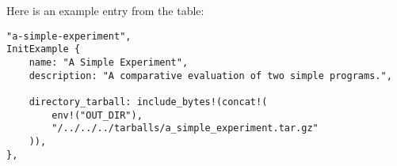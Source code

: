 Here is an example entry from the table:

\begin{verbatim}
"a-simple-experiment",
InitExample {
    name: "A Simple Experiment",
    description: "A comparative evaluation of two simple programs.",

    directory_tarball: include_bytes!(concat!(
        env!("OUT_DIR"),
        "/../../../tarballs/a_simple_experiment.tar.gz"
    )),
},
\end{verbatim}
